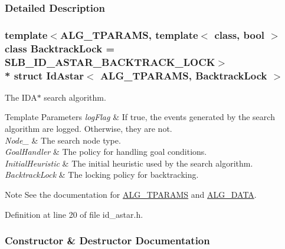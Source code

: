 \subsubsection{Detailed Description}
\subsubsection*{template$<$A\+L\+G\+\_\+\+T\+P\+A\+R\+A\+MS, template$<$ class, bool $>$ class Backtrack\+Lock = S\+L\+B\+\_\+\+I\+D\+\_\+\+A\+S\+T\+A\+R\+\_\+\+B\+A\+C\+K\+T\+R\+A\+C\+K\+\_\+\+L\+O\+CK$>$\\*
struct Id\+Astar$<$ A\+L\+G\+\_\+\+T\+P\+A\+R\+A\+M\+S, Backtrack\+Lock $>$}

The {\ttfamily I\+D\+A$\ast$} search algorithm. 


\begin{DoxyTemplParams}{Template Parameters}
{\em log\+Flag} & If {\ttfamily true}, the events generated by the search algorithm are logged. Otherwise, they are not. \\
\hline
{\em Node\+\_\+} & The search node type. \\
\hline
{\em Goal\+Handler} & The policy for handling goal conditions. \\
\hline
{\em Initial\+Heuristic} & The initial heuristic used by the search algorithm. \\
\hline
{\em Backtrack\+Lock} & The locking policy for backtracking. \\
\hline
\end{DoxyTemplParams}
\begin{DoxyNote}{Note}
See the documentation for \hyperlink{algorithm_8h_a521ad67aee0e10fb76ee132a9d5c0768}{A\+L\+G\+\_\+\+T\+P\+A\+R\+A\+MS} and \hyperlink{algorithm_8h_a64c012078deee9a30405e18ec11e6360}{A\+L\+G\+\_\+\+D\+A\+TA}. 
\end{DoxyNote}


Definition at line 20 of file id\+\_\+astar.\+h.



\subsubsection{Constructor \& Destructor Documentation}
